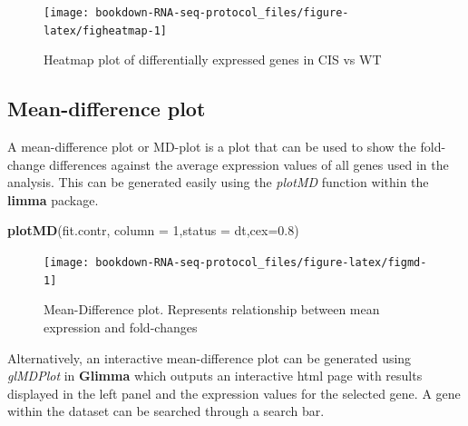 \documentclass[]{book}
\newenvironment{Shaded}{\begin{snugshade}}{\end{snugshade}}
\newcommand{\DataTypeTok}[1]{\textcolor[rgb]{0.13,0.29,0.53}{#1}}
\newcommand{\DecValTok}[1]{\textcolor[rgb]{0.00,0.00,0.81}{#1}}
\newcommand{\FloatTok}[1]{\textcolor[rgb]{0.00,0.00,0.81}{#1}}
\newcommand{\KeywordTok}[1]{\textcolor[rgb]{0.13,0.29,0.53}{\textbf{#1}}}
\newcommand{\NormalTok}[1]{#1}
\newcommand{\OperatorTok}[1]{\textcolor[rgb]{0.81,0.36,0.00}{\textbf{#1}}}
\newcommand{\StringTok}[1]{\textcolor[rgb]{0.31,0.60,0.02}{#1}}
\begin{document}
\begin{figure}

{\centering \texttt{[image: bookdown-RNA-seq-protocol\_files/figure-latex/figheatmap-1]} 

}

\caption{Heatmap plot of differentially expressed genes in CIS vs WT}\label{fig:figheatmap}
\end{figure}

\hypertarget{mean-difference-plot}{%
\subsection{Mean-difference plot}\label{mean-difference-plot}}

A mean-difference plot or MD-plot is a plot that can be used to show the fold-change differences against the average expression values of all genes used in the analysis. This can be generated easily using the \emph{plotMD} function within the \textbf{limma} package.

\begin{Shaded}
\begin{Highlighting}[]
\KeywordTok{plotMD}\NormalTok{(fit.contr, }\DataTypeTok{column =} \DecValTok{1}\NormalTok{,}\DataTypeTok{status =}\NormalTok{ dt,}\DataTypeTok{cex=}\FloatTok{0.8}\NormalTok{)}
\end{Highlighting}
\end{Shaded}

\begin{figure}

{\centering \texttt{[image: bookdown-RNA-seq-protocol\_files/figure-latex/figmd-1]} 

}

\caption{Mean-Difference plot. Represents relationship between mean expression and fold-changes}\label{fig:figmd}
\end{figure}

Alternatively, an interactive mean-difference plot can be generated using \emph{glMDPlot} in \textbf{Glimma} which outputs an interactive html page with results displayed in the left panel and the expression values for the selected gene. A gene within the dataset can be searched through a search bar.

\begin{Shaded}
\end{Shaded}
\end{document}
